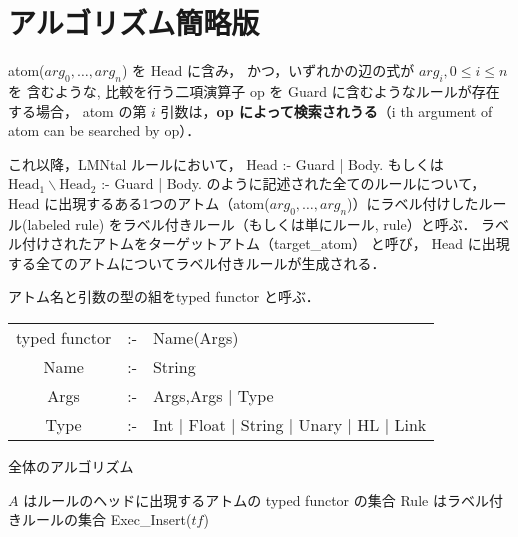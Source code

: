 \section{アルゴリズム簡略版}

\begin{definition}[検索されうる引数]
    atom($arg_0, \dots, arg_n$) を Head に含み，
    かつ，いずれかの辺の式が $arg_i, 0\leq i\leq n$ を
    含むような, 比較を行う二項演算子 op を Guard に含むようなルールが存在する場合，
    atom の第 $i$ 引数は，\textbf{op によって検索されうる}（i th argument of atom can be searched by op）．
    \end{definition}
    
    \begin{definition}
    これ以降，LMNtal ルールにおいて，
    Head :- Guard | Body. もしくは $\text{Head}_1 \backslash \text{Head}_2$ :- Guard | Body.
    のように記述された全てのルールについて，
    Head に出現するある1つのアトム（atom($arg_0,\dots, arg_n$)）にラベル付けしたルール(labeled rule) をラベル付きルール（もしくは単にルール, rule）と呼ぶ．
    ラベル付けされたアトムをターゲットアトム（target\_atom） と呼び，
    Head に出現する全てのアトムについてラベル付きルールが生成される．
    \end{definition}

\begin{definition}
    アトム名と引数の型の組をtyped functor と呼ぶ．
    \begin{tabular}{ccl}
        typed functor & :- & Name(Args)\\
        Name & :- & String\\
        Args & :- & Args,Args $\mid$ Type\\
        Type & :- & Int $\mid$ Float $\mid$ String $\mid$ Unary $\mid$ HL $\mid$ Link
    \end{tabular}
\end{definition}

\begin{algorithm}
    \caption{全体のアルゴリズム}
\begin{algorithmic}
    \scriptsize
    \Require $A$ はルールのヘッドに出現するアトムの typed functor の集合
    \Require Rule はラベル付きルールの集合 
                \State Exec\_Insert($\mathit{tf}$) 
        \EndWhile
    \EndProcedure
\end{algorithmic}
\end{algorithm}


